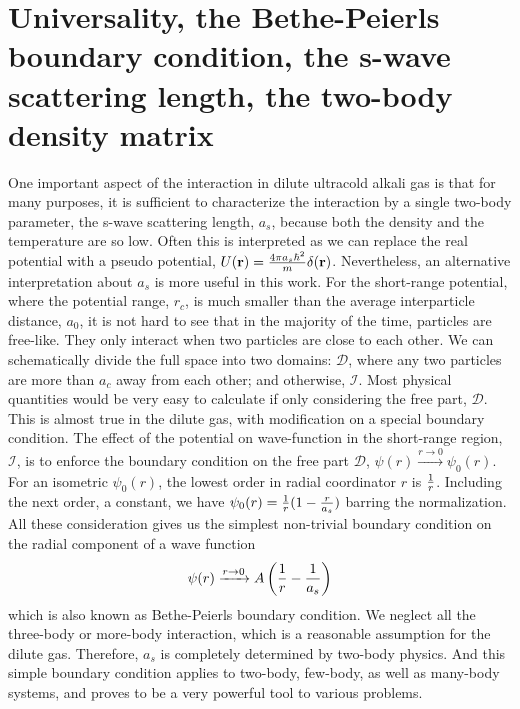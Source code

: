 \section{Universality,  the Bethe-Peierls boundary condition, the s-wave scattering length, the two-body density matrix\label{sec:intro:as}}
One important aspect of the interaction in dilute ultracold alkali gas is that for many purposes, it is sufficient to characterize the interaction  by a single two-body parameter, the s-wave scattering length, $a_s$,  because  both the density and the temperature are so low.  Often this is  interpreted as we can replace the real potential with a pseudo potential, $U(\mathbf{r})=\frac{4\pi{}a_{s}\hbar^{2}}{m}\delta(\mathbf{r})$\cite{pethick, LeggettBEC}.  Nevertheless, an alternative interpretation about $a_s$ is more useful in this work\cite{LeggettBEC, Tan2008-1,Tan2008-2,CombescotTan}.  For the short-range potential, where the potential range, $r_c$, is much smaller than the average interparticle distance, $a_0$, it is not hard to see that in the majority of the time, particles are free-like.  They only interact  when two particles are close to each other.  We can schematically divide the full space into two domains: $\mathcal{D}$, where any two particles are more than $a_c$ away from each other; and otherwise, $\mathcal{I}$. Most physical quantities would be very easy to calculate if only considering the free part, $\mathcal{D}$.  This is almost true in the dilute gas, with modification on a special  boundary condition.  The effect of the potential on wave-function in the short-range region, $\mathcal{I}$, is to enforce the boundary condition on the free part $\mathcal{D}$, $\psi(r)\xrightarrow{r\to0}\psi_{0}(r)$.  For an isometric $\psi_{0}(r)$, the lowest order in radial coordinator $r$ is $\frac{1}{r}$.   Including the next order, a constant,  we have $\psi_{0}(r)=\frac{1}{r}(1-\frac{r}{a_{s}})$ barring the normalization.  All these consideration gives us the simplest non-trivial boundary condition on the radial component of a wave function
\begin{equation}\label{eq:intro:Bethe}
\psi(r)\xrightarrow{r\to0}A\left(\frac{1}{r}-\frac{1}{a_s}\right)
\end{equation}
which is also known as Bethe-Peierls boundary condition\cite{BethePeierls}.  We neglect all the three-body or more-body interaction, which is a reasonable assumption for the dilute gas. Therefore,  $a_{s}$ is completely determined by two-body physics.  And   this simple boundary condition applies to two-body, few-body, as well as many-body systems, and proves to be a very powerful tool to various problems.  

